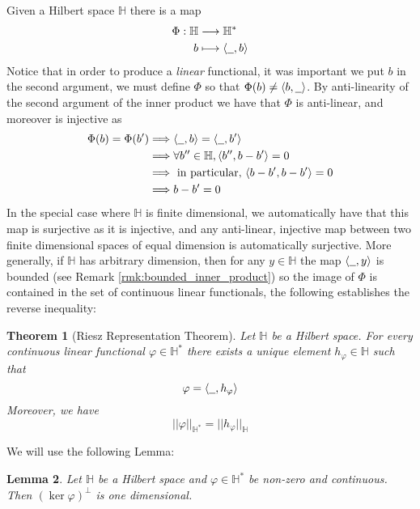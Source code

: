 \documentclass[12pt]{article}
\theoremstyle{plain}
\newtheorem{thm}{Theorem}[subsection] %
\newtheorem{lemma}[thm]{Lemma}
\theoremstyle{definition}
\newcommand{\bb}[1]{\mathbb{#1}}
\newcommand{\und}[1]{\underline{\hspace{#1 cm}}}
\newcommand{\lto}{\longrightarrow}
\begin{document}
Given a Hilbert space $\bb{H}$ there is a map
\begin{align}
	\Phi: \bb{H} &\lto \bb{H}^\ast\label{eq:Riesz_map}\\
	b &\longmapsto \langle \und{0.2}, b \rangle
\end{align}
Notice that in order to produce a \emph{linear} functional, it was important we put $b$ in the second argument, we must define $\Phi$ so that $\Phi(b) \neq \langle b, \und{0.2}\rangle$. By anti-linearity of the second argument of the inner product we have that $\Phi$ is anti-linear, and moreover is injective as
\begin{align*}
	\Phi(b) = \Phi(b') &\Longrightarrow \langle \und{0.2}, b\rangle = \langle \und{0.2}, b'\rangle\\
	&\Longrightarrow \forall b'' \in \bb{H}, \langle b'', b - b'\rangle = 0\\
	&\Longrightarrow \text{ in particular, } \langle b-b', b-b'\rangle = 0\\
	&\Longrightarrow b - b' = 0
\end{align*}
In the special case where $\bb{H}$ is finite dimensional, we automatically have that this map is surjective as it is injective, and any anti-linear, injective map between two finite dimensional spaces of equal dimension is automatically surjective. More generally, if $\bb{H}$ has arbitrary dimension, then for any $y \in \bb{H}$ the map $\langle \und{0.2},y\rangle$ is bounded (see Remark \ref{rmk:bounded_inner_product}) so the image of $\Phi$ is contained in the set of continuous linear functionals, the following establishes the reverse inequality:
\begin{thm}[Riesz Representation Theorem]\label{thm:riesz}
	Let $\bb{H}$ be a Hilbert space. For every continuous linear functional $\varphi \in \bb{H}^\ast$ there exists a unique element $h_\varphi \in \bb{H}$ such that
	\begin{equation}
		\varphi = \langle \und{0.2}, h_\varphi \rangle
	\end{equation}
	Moreover, we have
	\begin{equation}
		||\varphi||_{\bb{H}^\ast} = ||h_\varphi||_{\bb{H}}
	\end{equation}
\end{thm}
We will use the following Lemma:
\begin{lemma}\label{lem:one_dim_kernel}
	Let $\bb{H}$ be a Hilbert space and $\varphi \in \bb{H}^\ast$ be non-zero and continuous. Then $(\operatorname{ker}\varphi)^\perp$ is one dimensional.
\end{lemma}
\end{document}
